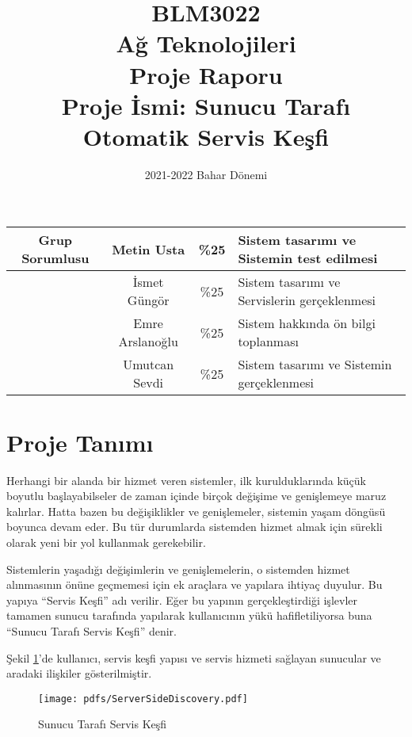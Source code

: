 \documentclass[12pt]{article}
\title{BLM3022\\
Ağ Teknolojileri\\
Proje Raporu\\
Proje İsmi: Sunucu Tarafı Otomatik Servis Keşfi}
\date{2021-2022 Bahar Dönemi}
\begin{document}
\maketitle
\begin{justify}

\begin{table}[H]
\centering
\label{tab:my-table}
\begin{tabular}{|c|c|c|l|}
\hline
\textbf{Grup Sorumlusu}    & Metin Usta      & \%25 & Sistem tasarımı ve Sistemin test edilmesi\\ \hline
\multirow{3}{*}{} & İsmet Güngör    & \%25 & Sistem tasarımı ve Servislerin gerçeklenmesi\\ \cline{2-4} 
                  & Emre Arslanoğlu & \%25 & Sistem hakkında ön bilgi toplanması \\ \cline{2-4} 
                  & Umutcan Sevdi   & \%25 & Sistem tasarımı ve Sistemin gerçeklenmesi \\ \hline
\end{tabular}
\end{table}

\tableofcontents
\pagebreak

\section{Proje Tanımı}
Herhangi bir alanda bir hizmet veren sistemler, ilk kurulduklarında küçük boyutlu başlayabilseler de zaman içinde birçok değişime ve genişlemeye maruz kalırlar. Hatta bazen bu değişiklikler ve genişlemeler, sistemin yaşam döngüsü boyunca devam eder. Bu tür durumlarda sistemden hizmet almak için sürekli olarak yeni bir yol kullanmak gerekebilir.

Sistemlerin yaşadığı değişimlerin ve genişlemelerin, o sistemden hizmet alınmasının önüne geçmemesi için ek araçlara ve yapılara ihtiyaç duyulur. Bu yapıya “Servis Keşfi” adı verilir. Eğer bu yapının gerçekleştirdiği işlevler tamamen sunucu tarafında yapılarak kullanıcının yükü hafifletiliyorsa buna “Sunucu Tarafı Servis Keşfi” denir.

Şekil \ref{fig:disc}’de kullanıcı, servis keşfi yapısı ve servis hizmeti sağlayan sunucular ve aradaki ilişkiler gösterilmiştir.

\begin{figure}[H]
    \centering
    \texttt{[image: pdfs/ServerSideDiscovery.pdf]}
    \caption{Sunucu Tarafı Servis Keşfi}
    \label{fig:disc}
\end{figure}


\end{justify}
\end{document}

